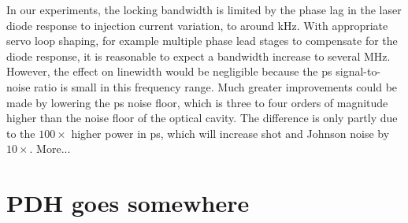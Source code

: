 In our experiments, the locking bandwidth is limited by the phase lag in the laser diode response to injection current variation, to around \unit[700]{kHz}.
With appropriate servo loop shaping, for example multiple phase lead stages to compensate for the diode response, it is reasonable to expect a bandwidth increase to several MHz.
However, the effect on linewidth would be negligible because the \gls*{ps} signal-to-noise ratio is small in this frequency range.
Much greater improvements could be made by lowering the \gls*{ps} noise floor, which is three to four orders of magnitude higher than the noise floor of the optical cavity.
The difference is only partly due to the $100\times$ higher power in \gls*{ps}, which will increase shot and Johnson noise by $10\times$.
 More...
 
\section{PDH goes somewhere}
